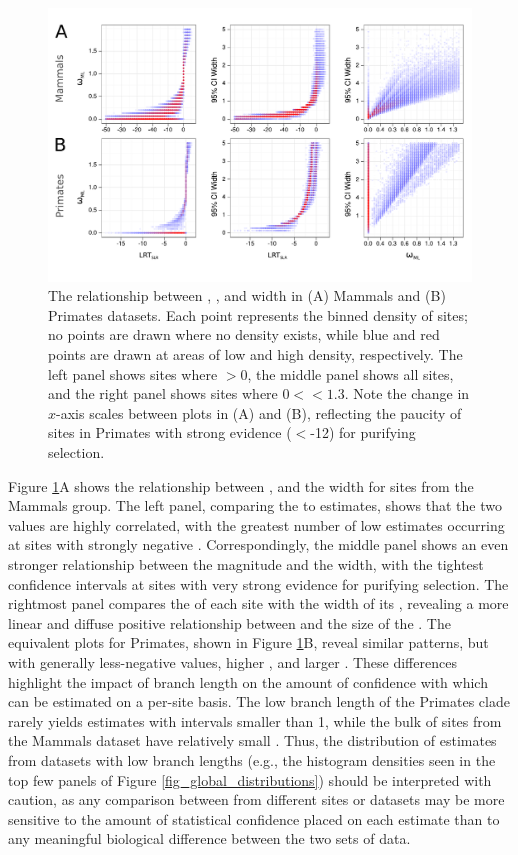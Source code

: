 \begin{figure}[t!]
\centering
\includegraphics[scale=0.5]{Figs/sites_scatters.pdf}
\caption{The relationship between \slrt, \omgml, and \ci width in (A)
  Mammals and (B) Primates datasets. Each point represents the binned
  density of sites; no points are drawn where no density exists, while
  blue and red points are drawn at areas of low and high density,
  respectively. The left panel shows sites where \omgml$>0$, the
  middle panel shows all sites, and the right panel shows sites where
  $0<$\xspace\omgml$<1.3$. Note the change in $x$-axis scales between plots
  in (A) and (B), reflecting the paucity of sites in Primates with
  strong evidence (\slrt$<$-12) for purifying selection.}
\label{fig_sites_scatters}
\end{figure}

Figure \ref{fig_sites_scatters}A shows the relationship between \slrt,
\omgml and the \ci width for sites from the Mammals group. The left
panel, comparing the \slrt to \nz \omgml estimates, shows that the two
values are highly correlated, with the greatest number of low \omgml
estimates occurring at sites with strongly negative
\slrt. Correspondingly, the middle panel shows an even stronger
relationship between the \slrt magnitude and the \ci width, with the
tightest confidence intervals at sites with very strong evidence for
purifying selection. The rightmost panel compares the \omgml of each
site with the width of its \ci, revealing a more linear and diffuse
positive relationship between \omgml and the size of the \ci. The
equivalent plots for Primates, shown in Figure
\ref{fig_sites_scatters}B, reveal similar patterns, but with generally
less-negative \slrt values, higher \omgml, and larger \ci. These
differences highlight the impact of branch length on the amount of
confidence with which \omg can be estimated on a per-site basis. The
low branch length of the Primates clade rarely yields \omgml estimates
with \ci intervals smaller than 1, while the bulk of sites from the
Mammals dataset have relatively small \ci. Thus, the distribution
of \omgml estimates from datasets with low branch lengths (e.g., the
histogram densities seen in the top few panels of Figure
\ref{fig_global_distributions}) should be interpreted with caution, as
any comparison between \omgml from different sites or datasets may be
more sensitive to the amount of statistical confidence placed on each
estimate than to any meaningful biological difference between the two
sets of data.

